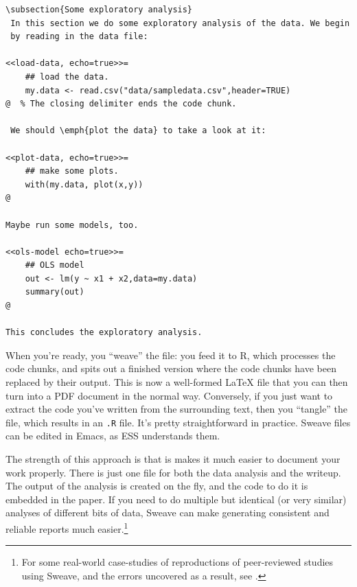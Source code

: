\documentclass[11pt,article,oneside]{memoir}
\begin{document}
\begin{listing}
\begin{verbatim}
\subsection{Some exploratory analysis}   
 In this section we do some exploratory analysis of the data. We begin
 by reading in the data file:
 
<<load-data, echo=true>>=
    ## load the data. 
    my.data <- read.csv("data/sampledata.csv",header=TRUE)
@  % The closing delimiter ends the code chunk.

 We should \emph{plot the data} to take a look at it:

<<plot-data, echo=true>>=
    ## make some plots.
    with(my.data, plot(x,y))
@

Maybe run some models, too.

<<ols-model echo=true>>=         
    ## OLS model
    out <- lm(y ~ x1 + x2,data=my.data)
    summary(out)
@ 
       
This concludes the exploratory analysis.
\end{verbatim}
\caption{\LaTeX\ and R code mixed together in an Sweave file.}
\label{lst:codechunk}
\end{listing}
 
When you're ready, you ``weave'' the file: you feed it to R, which
processes the code chunks, and spits out a finished version where the
code chunks have been replaced by their output. This is now a
well-formed \LaTeX{} file that you can then turn into a PDF document in
the normal way. Conversely, if you just want to extract the code
you've written from the surrounding text, then you ``tangle'' the file,
which results in an \texttt{.R} file. It's pretty straightforward in
practice. Sweave files can be edited in Emacs, as ESS understands
them.

The strength of this approach is that is makes it much easier to
document your work properly. There is just one file for both the data
analysis and the writeup. The output of the analysis is created on the
fly, and the code to do it is embedded in the paper. If you need to do
multiple but identical (or very similar) analyses of different bits of
data, Sweave can make generating consistent and reliable reports much
easier.\footnote{For some real-world case-studies of reproductions of
peer-reviewed studies using Sweave, and the errors uncovered as a
result, see \textcite{hothorn11:_case_studies_reprod}. }
\end{document}
